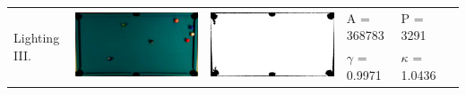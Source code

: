 \begin{tabular}{|l|c|c|l|l|c|}
\multirow{2}{*}{Lighting III.} & \multirow{2}{*}{\includegraphics[scale=0.05]{../images/1/14_img.png}} & \multirow{2}{*}{\includegraphics[scale=0.05]{../images/1/14_mask.png}} & A = 368783 & P = 3291 & \multirow{2}{*}{}\\ 
& & & $\gamma$ = 0.9971 & $\kappa$ = 1.0436 & \\
\hline


\end{tabular}
